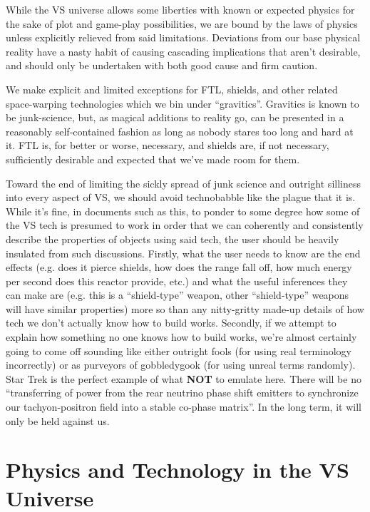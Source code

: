 \begin{itemize}
While the VS universe allows some liberties with known or
expected physics for the sake of plot and game-play possibilities, we
are bound by the laws of physics unless explicitly relieved from said
limitations. Deviations from our base physical reality have a nasty
habit of causing cascading implications that aren't desirable, and
should only be undertaken with both good cause and firm caution. 

We make explicit and limited exceptions for FTL, shields, and other
related space-warping technologies which we bin under
``gravitics''. Gravitics is known to be junk-science, but, as magical
additions to reality go, can be presented in a reasonably
self-contained fashion as long as nobody stares too long and hard at
it. FTL is, for better or worse, necessary, and shields are, if not
necessary, sufficiently desirable and expected that we've made room
for them.

Toward the end of limiting the sickly spread of junk science and
outright silliness into every aspect of VS, we should avoid
technobabble like the plague that it is. While it's fine, in documents
such as this, to ponder to some degree how some of the VS tech is
presumed to work in order that we can coherently and consistently
describe the properties of objects using said tech, the user should be
heavily insulated from such discussions. Firstly, what the user needs
to know are the end effects (e.g. does it pierce shields, how does the
range fall off, how much energy per second does this reactor provide,
etc.) and what the useful inferences they can make are (e.g. this is
a ``shield-type'' weapon, other ``shield-type'' weapons will have
similar properties) more so than any nitty-gritty made-up details of
how tech we don't actually know how to build works. Secondly, if we
attempt to explain how something no one knows how to build works,
we're almost certainly going to come off sounding like either outright
fools (for using real terminology incorrectly) or as purveyors of
gobbledygook (for using unreal terms randomly). Star Trek is the
perfect example of what {\bf NOT} to emulate here. There will be no
``transferring of power from the rear neutrino phase shift emitters
to synchronize our tachyon-positron field into a stable
co-phase matrix''. In the long term, it will only be held against us.

\end{itemize}


\section{Physics and Technology in the VS Universe}
\label{sec:VSphysics}
